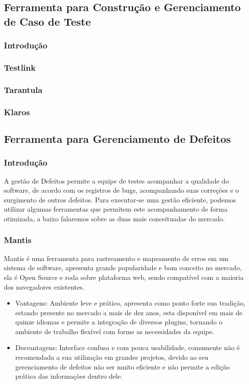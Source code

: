 \documentclass[12pt,a4paper]{article}
\begin{document}
	\subsection{Ferramenta para Construção e Gerenciamento de Caso de Teste}
		\subsubsection{Introdução}
		\subsubsection{Testlink}
		\subsubsection{Tarantula}
		\subsubsection{Klaros}
		
	\subsection{Ferramenta para Gerenciamento de Defeitos}
		\subsubsection{Introdução}
		
			A gestão de Defeitos permite a equipe de testes acompanhar a qualidade do software, 
			de acordo com os registros de bugs, acompanhando suas correções e o surgimento de outros defeitos. 
			Para executar-se uma gestão eficiente, podemos utilizar algumas ferramentas que permitem este acompanhamento de forma otimizada, 
			a baixo falaremos sobre as duas mais conceituadas do mercado.
			
		\subsubsection{Mantis}
		
			Mantis é uma ferramenta para rastreamento e mapeamento de erros em um sistema de software, 
			apresenta grande popularidade e bom conceito no mercado, ela é Open Source e roda sobre plataforma web, 
			sendo compatível com a maioria dos navegadores existentes. 	

				\begin{itemize}
					\item Vantagens: 
						Ambiente leve e prático, apresenta como ponto forte sua tradição, estando presente no mercado a mais de dez anos, 
					  esta disponível em mais de quinze idiomas e permite a integração de diversos plugins, tornando o ambiente de trabalho flexível
					  com forme as necessidades da equipe. 					
					
					\item Desvantagens:
						Interface confusa e com pouca usabilidade, comumente não é recomendada a sua utilização em grandes projetos, 
						devido ao seu gerenciamento de defeitos não ser muito eficiente e não permite a edição prática das informações dentro dele. 
						
				\end{itemize}
						
\end{document}
